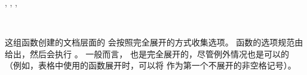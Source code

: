 \documentclass{l3doc}
\begin{document}
\begin{function}
{
    \NewExpandableDocumentCommand     ,
    \RenewExpandableDocumentCommand   ,
    \ProvideExpandableDocumentCommand ,
    \DeclareExpandableDocumentCommand
}
\begin{syntax}
    ~~~~  
\end{syntax}
%
这组函数创建的文档层面的  会按照完全展开的方式收集选项。
函数的选项规范由  给出，然后会执行 。
一般而言， 也是完全展开的，尽管例外情况也是可以的
（例如，表格中使用的函数展开时，可以将  作为第一个不展开的非空格记号）。


\end{function}
\end{document}
